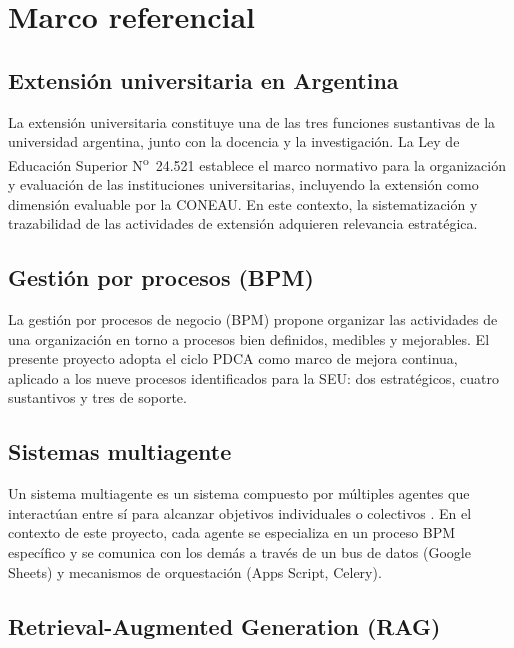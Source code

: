 \documentclass[a4paper, 12pt]{article}
\begin{document}
\section{Marco referencial}

\subsection{Extensi\'on universitaria en Argentina}

La extensi\'on universitaria constituye una de las tres funciones sustantivas de la universidad argentina, junto con la docencia y la investigaci\'on. La Ley de Educaci\'on Superior N\textsuperscript{o}~24.521 \parencite{ley24521} establece el marco normativo para la organizaci\'on y evaluaci\'on de las instituciones universitarias, incluyendo la extensi\'on como dimensi\'on evaluable por la \ac{CONEAU}. En este contexto, la sistematizaci\'on y trazabilidad de las actividades de extensi\'on adquieren relevancia estrat\'egica.

\subsection{Gesti\'on por procesos (BPM)}

La gesti\'on por procesos de negocio (\ac{BPM}) propone organizar las actividades de una organizaci\'on en torno a procesos bien definidos, medibles y mejorables. El presente proyecto adopta el ciclo \ac{PDCA} como marco de mejora continua, aplicado a los nueve procesos identificados para la \ac{SEU}: dos estrat\'egicos, cuatro sustantivos y tres de soporte.

\subsection{Sistemas multiagente}

Un sistema multiagente es un sistema compuesto por m\'ultiples agentes que interact\'uan entre s\'i para alcanzar objetivos individuales o colectivos \parencite{wooldridge2009}. En el contexto de este proyecto, cada agente se especializa en un proceso \ac{BPM} espec\'ifico y se comunica con los dem\'as a trav\'es de un bus de datos (Google Sheets) y mecanismos de orquestaci\'on (Apps Script, Celery).

\subsection{Retrieval-Augmented Generation (RAG)}
\end{document}
